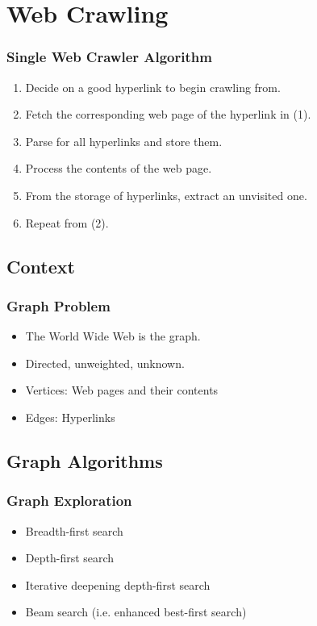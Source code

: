 \documentclass{beamer}
\begin{document}
\section{Web Crawling}
\begin{frame}
\frametitle{Single Web Crawler Algorithm}
\begin{enumerate}
\item Decide on a good hyperlink to begin crawling from.
\item Fetch the corresponding web page of the hyperlink in (1).
\item Parse for all hyperlinks and store them.
\item Process the contents of the web page.
\item From the storage of hyperlinks, extract an unvisited one.
\item Repeat from (2).
\end{enumerate}
\end{frame}

\subsection{Context}
\begin{frame}
\frametitle{Graph Problem}
\begin{itemize}
\item The World Wide Web is the graph.
\item Directed, unweighted, unknown.
\item Vertices: Web pages and their contents
\item Edges: Hyperlinks
\end{itemize}
\end{frame}

\subsection{Graph Algorithms}
\begin{frame}
\frametitle{Graph Exploration}
\begin{itemize}
\item Breadth-first search
\item Depth-first search
\item Iterative deepening depth-first search
\item Beam search (i.e. enhanced best-first search)
\end{itemize}
\end{frame}
\end{document}
